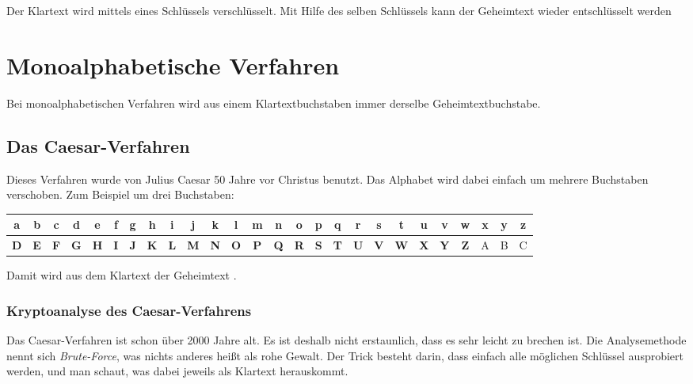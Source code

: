 Der Klartext wird mittels eines Schlüssels verschlüsselt. Mit Hilfe des selben
Schlüssels kann der Geheimtext wieder entschlüsselt werden

\section{Monoalphabetische Verfahren}

Bei monoalphabetischen Verfahren wird aus einem Klartextbuchstaben immer
derselbe Geheimtextbuchstabe.

\subsection{Das Caesar-Verfahren}

Dieses Verfahren wurde von Julius Caesar 50 Jahre vor Christus benutzt. Das
Alphabet wird dabei einfach um mehrere Buchstaben verschoben. Zum Beispiel um
drei Buchstaben:

\bgroup
\def\arraystretch{1.2}
\setlength{\tabcolsep}{.5em}
\begin{tabular}{|c|c|c|c|c|c|c|c|c|c|c|c|c|c|c|c|c|c|c|c|c|c|c|c|c|c|}\hline
a & b & c & \textbf{d} & \textbf{e} & \textbf{f} & \textbf{g} & \textbf{h} &
\textbf{i} & \textbf{j} & \textbf{k} & \textbf{l} & \textbf{m} & \textbf{n} &
\textbf{o} & \textbf{p} & \textbf{q} & \textbf{r} & \textbf{s} & \textbf{t} &
\textbf{u} & \textbf{v} & \textbf{w} & \textbf{x} & \textbf{y} & \textbf{z}
\\ \hline
\textbf{D} & \textbf{E} & \textbf{F} & \textbf{G} & \textbf{H} & \textbf{I} &
\textbf{J} & \textbf{K} & \textbf{L} & \textbf{M} & \textbf{N} & \textbf{O} &
\textbf{P} & \textbf{Q} & \textbf{R} & \textbf{S} & \textbf{T} & \textbf{U} &
\textbf{V} & \textbf{W} & \textbf{X} & \textbf{Y} & \textbf{Z} & A & B & C
\\ \hline
\end{tabular}
\egroup

Damit wird aus dem Klartext  der Geheimtext
.

\subsubsection{Kryptoanalyse des Caesar-Verfahrens}

Das Caesar-Verfahren ist schon über 2000 Jahre alt. Es ist deshalb nicht
erstaunlich, dass es sehr leicht zu brechen ist. Die Analysemethode nennt sich
\emph{Brute-Force}, was nichts anderes heißt als \glqq rohe Gewalt\grqq . Der
Trick besteht darin, dass einfach alle möglichen Schlüssel ausprobiert werden,
und man schaut, was dabei jeweils als Klartext herauskommt.


